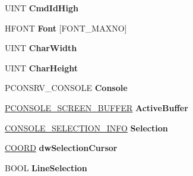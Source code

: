 \begin{DoxyCompactItemize}
U\+I\+NT {\bfseries Cmd\+Id\+High}
\item 
\mbox{\label{struct___g_u_i___c_o_n_s_o_l_e___d_a_t_a_a8319c338911fbf73db6b3a9e265a65b9}} 
H\+F\+O\+NT {\bfseries Font} \mbox{[}F\+O\+N\+T\+\_\+\+M\+A\+X\+NO\mbox{]}
\item 
\mbox{\label{struct___g_u_i___c_o_n_s_o_l_e___d_a_t_a_aac97d12b615acae0436da9e31c68050a}} 
U\+I\+NT {\bfseries Char\+Width}
\item 
\mbox{\label{struct___g_u_i___c_o_n_s_o_l_e___d_a_t_a_aec914692402b1387712d5a6cebdf2134}} 
U\+I\+NT {\bfseries Char\+Height}
\item 
\mbox{\label{struct___g_u_i___c_o_n_s_o_l_e___d_a_t_a_a8570c30b6fe44288120e3f65ccd46271}} 
P\+C\+O\+N\+S\+R\+V\+\_\+\+C\+O\+N\+S\+O\+LE {\bfseries Console}
\item 
\mbox{\label{struct___g_u_i___c_o_n_s_o_l_e___d_a_t_a_a23a5c0038c8a32246340bccca2f10020}} 
\hyperlink{struct___c_o_n_s_o_l_e___s_c_r_e_e_n___b_u_f_f_e_r}{P\+C\+O\+N\+S\+O\+L\+E\+\_\+\+S\+C\+R\+E\+E\+N\+\_\+\+B\+U\+F\+F\+ER} {\bfseries Active\+Buffer}
\item 
\mbox{\label{struct___g_u_i___c_o_n_s_o_l_e___d_a_t_a_a590264700c6cb2dc3aca3dde768fc3cb}} 
\hyperlink{struct___c_o_n_s_o_l_e___s_e_l_e_c_t_i_o_n___i_n_f_o}{C\+O\+N\+S\+O\+L\+E\+\_\+\+S\+E\+L\+E\+C\+T\+I\+O\+N\+\_\+\+I\+N\+FO} {\bfseries Selection}
\item 
\mbox{\label{struct___g_u_i___c_o_n_s_o_l_e___d_a_t_a_af877939c808fc1b027cefe044e4c80e3}} 
\hyperlink{struct___c_o_o_r_d}{C\+O\+O\+RD} {\bfseries dw\+Selection\+Cursor}
\item 
\mbox{\label{struct___g_u_i___c_o_n_s_o_l_e___d_a_t_a_a7a0155d686bb1f8a57214d63a83523ca}} 
B\+O\+OL {\bfseries Line\+Selection}
\item 
\mbox{\label{struct___g_u_i___c_o_n_s_o_l_e___d_a_t_a_ac473409332e082c2228ac6fe21de64d6}} 

\end{DoxyCompactItemize}
